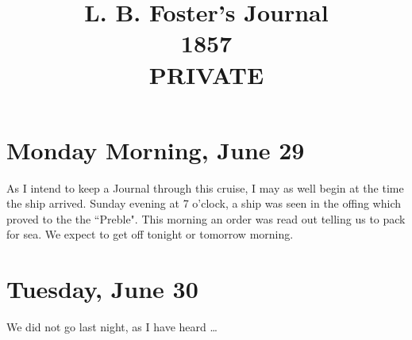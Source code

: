\documentclass{article}
\title{L. B. F{\sc oster's} J{\sc ournal} \\ 1857 \\ PRIVATE}
\date{}
\begin{document}
\maketitle
\section*{Monday Morning, June 29}
As I intend to keep a Journal through this cruise, I may as well begin at the time the ship arrived. Sunday evening at 7 o'clock, a ship was seen in the offing which proved to the the ``Preble". This morning an order was read out telling us to pack for sea. We expect to get off tonight or tomorrow morning.

\section*{Tuesday, June 30}
We did not go last night, as I have heard \ldots
\end{document}
